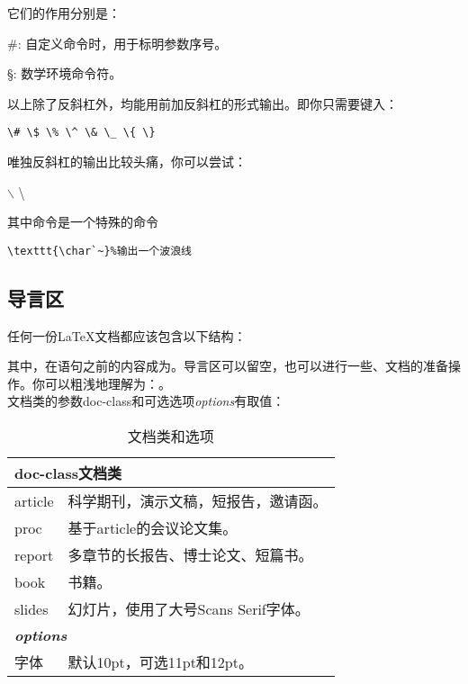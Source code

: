 它们的作用分别是：
\begin{para}
\item[\#{}:]自定义命令时，用于标明参数序号。
\item[\S{}:]数学环境命令符。
\end{para}

以上除了反斜杠外，均能用前加反斜杠的形式输出。即你只需要键入：
\begin{center}
\verb|\# \$ \% \^ \& \_ \{ \}|
\end{center}

唯独反斜杠的输出比较头痛，你可以尝试：
\begin{codeshow}
$\backslash$ \textbackslash
\texttt{}
\end{codeshow}

其中命令是一个特殊的命令
\begin{verbatim}
\texttt{\char`~}%输出一个波浪线
\end{verbatim}

\subsection{导言区}
任何一份\LaTeX{}文档都应该包含以下结构：
其中，在语句之前的内容成为。导言区可以留空，也可以进行一些、文档的准备操作。你可以粗浅地理解为：。\\

文档类的参数doc-class和可选选项{\textit{options}}有取值：%
	\begin{table}[!htb]
	\centering
	\caption{文档类和选项}
	\label{tab:documentclass}
	\begin{tabular}{p{5em} @{\ -\ } p{24em}}
		\hline
		\\
		\hline
		article & 科学期刊，演示文稿，短报告，邀请函。\\
		proc	& 基于article的会议论文集。\\
		report	& 多章节的长报告、博士论文、短篇书。\\
		book	& 书籍。\\
		slides	& 幻灯片，使用了大号Scans Serif字体。\\
		\hline
		\\
		\hline
		字体	&默认10pt，可选11pt和12pt。\\
		\hline
	\end{tabular}
\end{table}


